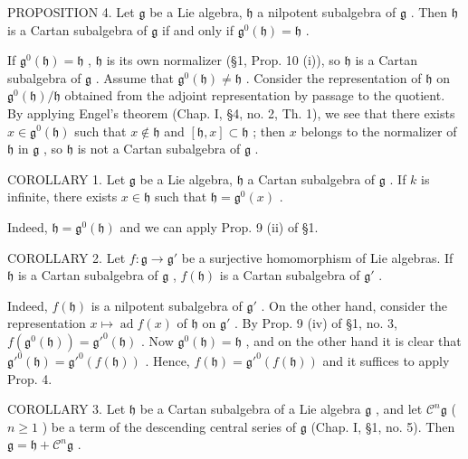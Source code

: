 PROPOSITION 4. Let \(\mathfrak{g}\) be a Lie algebra, \(\mathfrak{h}\) a nilpotent subalgebra of \(\mathfrak{g}\) . Then \(\mathfrak{h}\) is a Cartan subalgebra of \(\mathfrak{g}\) if and only if \(\mathfrak{g}^0 (\mathfrak{h}) = \mathfrak{h}\) .

If \(\mathfrak{g}^0 (\mathfrak{h}) = \mathfrak{h}\) , \(\mathfrak{h}\) is its own normalizer (§1, Prop. 10 (i)), so \(\mathfrak{h}\) is a Cartan subalgebra of \(\mathfrak{g}\) . Assume that \(\mathfrak{g}^0 (\mathfrak{h})\neq \mathfrak{h}\) . Consider the representation of \(\mathfrak{h}\) on \(\mathfrak{g}^0 (\mathfrak{h}) / \mathfrak{h}\) obtained from the adjoint representation by passage to the quotient. By applying Engel's theorem (Chap. I, §4, no. 2, Th. 1), we see that there exists \(x\in \mathfrak{g}^0 (\mathfrak{h})\) such that \(x\notin \mathfrak{h}\) and \([\mathfrak{h},x]\subset \mathfrak{h}\) ; then \(x\) belongs to the normalizer of \(\mathfrak{h}\) in \(\mathfrak{g}\) , so \(\mathfrak{h}\) is not a Cartan subalgebra of \(\mathfrak{g}\) .

COROLLARY 1. Let \(\mathfrak{g}\) be a Lie algebra, \(\mathfrak{h}\) a Cartan subalgebra of \(\mathfrak{g}\) . If \(k\) is infinite, there exists \(x \in \mathfrak{h}\) such that \(\mathfrak{h} = \mathfrak{g}^0(x)\) .

Indeed, \(\mathfrak{h} = \mathfrak{g}^0 (\mathfrak{h})\) and we can apply Prop. 9 (ii) of §1.

COROLLARY 2. Let \(f: \mathfrak{g} \to \mathfrak{g}'\) be a surjective homomorphism of Lie algebras. If \(\mathfrak{h}\) is a Cartan subalgebra of \(\mathfrak{g}\) , \(f(\mathfrak{h})\) is a Cartan subalgebra of \(\mathfrak{g}'\) .

Indeed, \(f(\mathfrak{h})\) is a nilpotent subalgebra of \(\mathfrak{g}'\) . On the other hand, consider the representation \(x \mapsto \operatorname{ad} f(x)\) of \(\mathfrak{h}\) on \(\mathfrak{g}'\) . By Prop. 9 (iv) of §1, no. 3, \(f(\mathfrak{g}^0(\mathfrak{h})) = \mathfrak{g}'^0(\mathfrak{h})\) . Now \(\mathfrak{g}^0(\mathfrak{h}) = \mathfrak{h}\) , and on the other hand it is clear that \(\mathfrak{g}'^0(\mathfrak{h}) = \mathfrak{g}'^0(f(\mathfrak{h}))\) . Hence, \(f(\mathfrak{h}) = \mathfrak{g}'^0(f(\mathfrak{h}))\) and it suffices to apply Prop. 4.

COROLLARY 3. Let \(\mathfrak{h}\) be a Cartan subalgebra of a Lie algebra \(\mathfrak{g}\) , and let \(\mathcal{C}^n\mathfrak{g}\) ( \(n \geq 1\) ) be a term of the descending central series of \(\mathfrak{g}\) (Chap. I, §1, no. 5). Then \(\mathfrak{g} = \mathfrak{h} + \mathcal{C}^n\mathfrak{g}\) .

